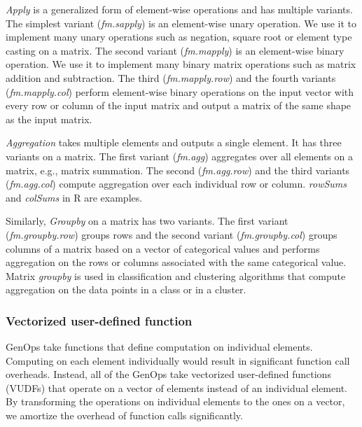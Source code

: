 \textit{Apply} is a generalized form of element-wise operations and has
multiple variants. The simplest variant (\textit{fm.sapply}) is
an element-wise unary operation. We use it to implement many unary
operations such as negation, square root or element type casting
on a matrix. The second variant (\textit{fm.mapply}) is an
element-wise binary operation. We use it to implement many binary
matrix operations such as matrix addition and subtraction. The third
(\textit{fm.mapply.row}) and the fourth variants (\textit{fm.mapply.col}) perform element-wise
binary operations on the input vector with every row or column of the input
matrix and output a matrix of the same shape as the input matrix.

\textit{Aggregation} takes multiple elements and outputs a single element.
It has three variants on a matrix. The first variant (\textit{fm.agg})
aggregates over all elements on a matrix, e.g., matrix summation. The second
(\textit{fm.agg.row}) and the third variants (\textit{fm.agg.col})
compute aggregation over each individual row or column. \textit{rowSums}
and \textit{colSums} in R are examples.

Similarly, \textit{Groupby} on a matrix has two variants.
The first variant (\textit{fm.groupby.row}) groups rows and the second variant
(\textit{fm.groupby.col}) groups columns of a matrix based on a vector of
categorical values and performs aggregation on the rows or
columns associated with the same categorical value. Matrix \textit{groupby}
is used in classification and clustering algorithms that compute
aggregation on the data points in a class or in a cluster.

\subsubsection{Vectorized user-defined function} \label{sec:vudf}
GenOps take functions that define computation on individual elements.
Computing on each element individually would
result in significant function call overheads. Instead, all of
the GenOps take vectorized user-defined functions (VUDFs) that operate on
a vector of elements instead of an individual element. By transforming
the operations on individual elements to the ones on a vector, we amortize
the overhead of function calls significantly.

